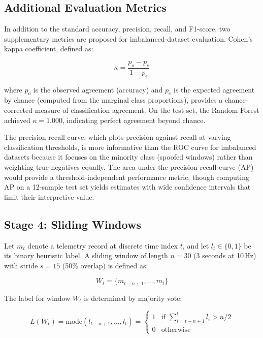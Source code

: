 \subsection{Additional Evaluation Metrics}

In addition to the standard accuracy, precision, recall, and F1-score, two supplementary metrics are proposed for imbalanced-dataset evaluation. Cohen's kappa coefficient, defined as:

\begin{equation}
    \kappa = \frac{p_o - p_e}{1 - p_e}
    \label{eq:kappa}
\end{equation}

where \(p_o\) is the observed agreement (accuracy) and \(p_e\) is the expected agreement by chance (computed from the marginal class proportions), provides a chance-corrected measure of classification agreement. On the test set, the Random Forest achieved $\kappa = 1.000$, indicating perfect agreement beyond chance.

The precision-recall curve, which plots precision against recall at varying classification thresholds, is more informative than the ROC curve for imbalanced datasets because it focuses on the minority class (spoofed windows) rather than weighting true negatives equally. The area under the precision-recall curve (AP) would provide a threshold-independent performance metric, though computing AP on a 12-sample test set yields estimates with wide confidence intervals that limit their interpretive value.

\subsection{Stage 4: Sliding Windows}\label{sec:windows}

Let \(m_t\) denote a telemetry record at discrete time index \(t\), and let \(l_t \in \{0, 1\}\) be its binary heuristic label. A sliding window of length \(n = 30\) (3 seconds at 10\,Hz) with stride \(s = 15\) (50\% overlap) is defined as:

\begin{equation}
    W_t = \{ m_{t-n+1}, \dots, m_t \}
    \label{eq:window}
\end{equation}

The label for window \(W_t\) is determined by majority vote:

\begin{equation}
    L(W_t) = \text{mode}(l_{t-n+1}, \dots, l_t) =
    \begin{cases}
        1 & \text{if } \sum_{i=t-n+1}^{t} l_i > n/2 \\[4pt]
        0 & \text{otherwise}
    \end{cases}
    \label{eq:majority}
\end{equation}

